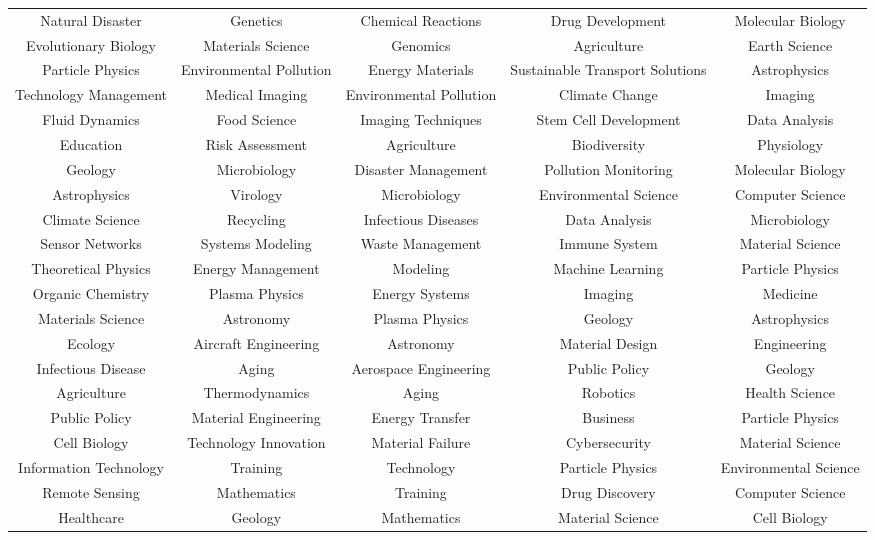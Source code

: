 \begin{table}[H]
\begin{adjustbox}{width=\textwidth}
\begin{tabular}{ *{5}{c} }
Natural Disaster	&	Genetics	&	Chemical Reactions	&	Drug Development	&	Molecular Biology	\\
Evolutionary Biology	&	Materials Science	&	Genomics	&	Agriculture	&	Earth Science	\\
Particle Physics	&	Environmental Pollution	&	Energy Materials	&	Sustainable Transport Solutions	&	Astrophysics	\\
Technology Management	&	Medical Imaging	&	Environmental Pollution	&	Climate Change	&	Imaging	\\
Fluid Dynamics	&	Food Science	&	Imaging Techniques	&	Stem Cell Development	&	Data Analysis	\\
Education	&	Risk Assessment	&	Agriculture	&	Biodiversity	&	Physiology	\\
Geology	&	Microbiology	&	Disaster Management	&	Pollution Monitoring	&	Molecular Biology	\\
Astrophysics	&	Virology	&	Microbiology	&	Environmental Science	&	Computer Science	\\
Climate Science	&	Recycling	&	Infectious Diseases	&	Data Analysis	&	Microbiology	\\
Sensor Networks	&	Systems Modeling	&	Waste Management	&	Immune System	&	Material Science	\\
Theoretical Physics	&	Energy Management	&	Modeling	&	Machine Learning	&	Particle Physics	\\
Organic Chemistry	&	Plasma Physics	&	Energy Systems	&	Imaging	&	Medicine	\\
Materials Science	&	Astronomy	&	Plasma Physics	&	Geology	&	Astrophysics	\\
Ecology	&	Aircraft Engineering	&	Astronomy	&	Material Design	&	Engineering	\\
Infectious Disease	&	Aging	&	Aerospace Engineering	&	Public Policy	&	Geology	\\
Agriculture	&	Thermodynamics	&	Aging	&	Robotics	&	Health Science	\\
Public Policy	&	Material Engineering	&	Energy Transfer	&	Business	&	Particle Physics	\\
Cell Biology	&	Technology Innovation	&	Material Failure	&	Cybersecurity	&	Material Science	\\
Information Technology	&	Training	&	Technology	&	Particle Physics	&	Environmental Science	\\
Remote Sensing	&	Mathematics	&	Training	&	Drug Discovery	&	Computer Science	\\
Healthcare	&	Geology	&	Mathematics	&	Material Science	&	Cell Biology	\\

\end{tabular}
\end{adjustbox}
\end{table}
